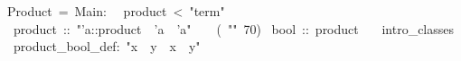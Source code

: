 \begin{isabelle}%
\isanewline
\isanewline
{}~Product~=~Main:\isanewline
\isanewline
{}\isanewline
~~product~<~{"}term{"}\isanewline
{}\isanewline
~~product~::~{"}'a::product~{\isasymRightarrow}~'a~{\isasymRightarrow}~'a{"}~~~~(~{"}{\isasymotimes}{"}~70)\isanewline
\isanewline
{}~bool~::~product\isanewline
~~~intro\_classes\isanewline
{}\isanewline
~~product\_bool\_def:~{"}x~{\isasymotimes}~y~{\isasymequiv}~x~{\isasymand}~y{"}\isanewline
\isanewline
{}\end{isabelle}%
